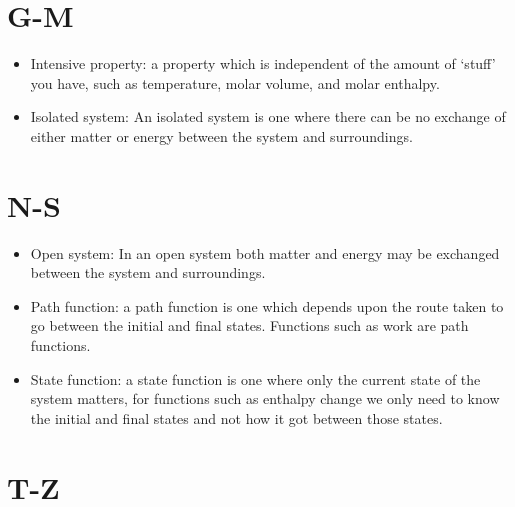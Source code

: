 \documentclass[
]{book}
\begin{document}
\hypertarget{g-m}{%
\section*{G-M}\label{g-m}}

\begin{itemize}
\item
  Intensive property: a property which is independent of the amount of `stuff' you have, such as temperature, molar volume, and molar enthalpy.
\item
  Isolated system: An isolated system is one where there can be no exchange of either matter or energy between the system and surroundings.
\end{itemize}

\hypertarget{n-s}{%
\section*{N-S}\label{n-s}}

\begin{itemize}
\item
  Open system: In an open system both matter and energy may be exchanged between the system and surroundings.
\item
  Path function: a path function is one which depends upon the route taken to go between the initial and final states. Functions such as work are path functions.
\item
  State function: a state function is one where only the current state of the system matters, for functions such as enthalpy change we only need to know the initial and final states and not how it got between those states.
\end{itemize}

\hypertarget{t-z}{%
\section*{T-Z}\label{t-z}}

  
\end{document}
